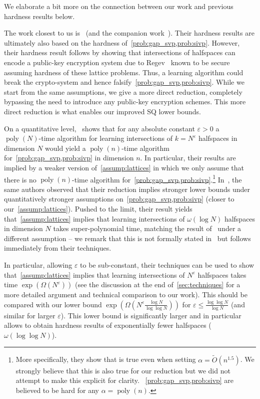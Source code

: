 \documentclass{theoretics}
\DeclareMathOperator{\poly}{poly}
\renewcommand{\leq}{\leqslant}
\let\epsilon=\varepsilon
\newcommand{\e}{\epsilon}
\begin{document}
We elaborate a bit more on the connection between our work and previous hardness results below.

The work closest to us is~\cite{klivans2009cryptographic} (and the companion work~\cite{klivans2006cryptographic}).
Their hardness results are ultimately also based on the hardness of~\cref{prob:gap_svp,prob:sivp}.
However, their hardness result follows by showing that intersections of halfspaces can encode a public-key encryption system due to Regev~\cite{DBLP:journals/jacm/Regev09} known to be secure assuming hardness of these lattice problems.
Thus, a learning algorithm could break the crypto-system and hence falsify~\cref{prob:gap_svp,prob:sivp}.
While we start from the same assumptions, we give a more direct reduction, completely bypassing the need to introduce any public-key encryption schemes.
This more direct reduction is what enables our improved SQ lower bounds.

On a quantitative level,~\cite{klivans2009cryptographic} shows that for any absolute constant $\e > 0$ a $\poly(N)$-time algorithm for learning intersections of $k = N^\e$ halfspaces in dimension $N$ would yield a $\poly(n)$-time algorithm for~\cref{prob:gap_svp,prob:sivp} in dimension $n$.
In particular, their results are implied by a weaker version of~\cref{assump:lattices} in which we only assume that there is no $\poly(n)$-time algorithm for~\cref{prob:gap_svp,prob:sivp}.\footnote{More specifically, they show that is true even when setting $\alpha = \tilde{O}(n^{1.5})$. We strongly believe that this is also true for our reduction but we did not attempt to make this explicit for clarity. ~\cref{prob:gap_svp,prob:sivp} are believed to be hard for any $\alpha = \poly(n)$.}
In~\cite{klivans2006cryptographic}, the same authors observed that their reduction implies stronger lower bounds under quantitatively stronger assumptions on~\cref{prob:gap_svp,prob:sivp} (closer to our~\cref{assump:lattices}).
Pushed to the limit, their result yields that~\cref{assump:lattices} implies that learning intersections of $\omega(\log N)$ halfspaces in dimension $N$ takes super-polynomial time, matching the result of~\cite{daniely2016complexity} under a different assumption -- we remark that this is not formally stated in~\cite{klivans2006cryptographic} but follows immediately from their techniques.

In particular, allowing $\e$ to be sub-constant, their techniques can be used to  show that~\cref{assump:lattices} implies that learning intersections of $N^\e$ halfspaces takes time $\exp(\Omega(N^\e))$ (see the discussion at the end of~\cref{sec:techniques} for a more detailed argument and technical comparison to our work).
This should be compared with our lower bound $\exp(\Omega(N^\e \tfrac{\log N}{\log\log N}))$ for $\e \leq \tfrac{\log\log N }{\log N}$ (and similar for larger $\e$).
This lower bound is significantly larger and in particular allows to obtain hardness results of exponentially fewer halfspaces ($\omega(\log\log N)$).
\end{document}
